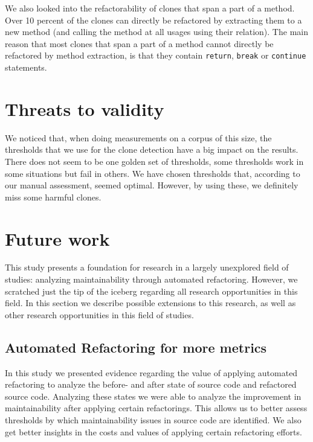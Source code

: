 We also looked into the refactorability of clones that span a part of a method. Over 10 percent of the clones can directly be refactored by extracting them to a new method (and calling the method at all usages using their relation). The main reason that most clones that span a part of a method cannot directly be refactored by method extraction, is that they contain \texttt{return}, \texttt{break} or \texttt{continue} statements.

\section{Threats to validity}\label{chap:threatstovalidity}
We noticed that, when doing measurements on a corpus of this size, the thresholds that we use for the clone detection have a big impact on the results. There does not seem to be one golden set of thresholds, some thresholds work in some situations but fail in others. We have chosen thresholds that, according to our manual assessment, seemed optimal. However, by using these, we definitely miss some harmful clones.

\section{Future work} \label{sec:future_work}
This study presents a foundation for research in a largely unexplored field of studies: analyzing maintainability through automated refactoring. However, we scratched just the tip of the iceberg regarding all research opportunities in this field. In this section we describe possible extensions to this research, as well as other research opportunities in this field of studies.

\subsection{Automated Refactoring for more metrics}
In this study we presented evidence regarding the value of applying automated refactoring to analyze the before- and after state of source code and refactored source code. Analyzing these states we were able to analyze the improvement in maintainability after applying certain refactorings. This allows us to better assess thresholds by which maintainability issues in source code are identified. We also get better insights in the costs and values of applying certain refactoring efforts.

